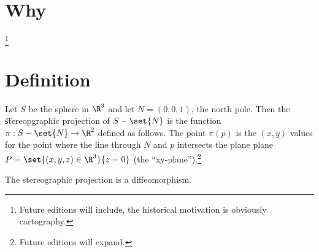 
\section*{Why}
\footnote{Future editions will include, the historical motivation is obviously cartography.}
\section*{Definition}

Let $S$ be the sphere in $\R ^3$ and let $N = (0, 0, 1)$, the north pole.
Then the \t{stereopgraphic projection} of $S - \set{N}$ is the function $\pi : S - \set{N} \to \R ^2$ defined as follows.
The point $\pi (p)$ is the $(x, y)$ values for the point where the line through $N$ and $p$ intersects the plane plane $P = \set{(x, y, z) \in \R ^3}{z = 0}$ (the ``xy-plane'').\footnote{Future editions will expand.}

\begin{proposition}
The stereographic projection is a diffeomorphism.
\end{proposition}

\blankpage